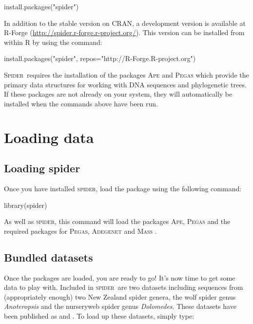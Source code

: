 \documentclass{article}
\newcommand{\spider}{\textsc{spider}} %
\newcommand{\Spider}{\textsc{Spider}} %
\newcommand{\scinm}{\emph}
\newcommand{\progname}[1]{\textsc{#1}}
\begin{document}
\begin{console}
install.packages("spider")
\end{console}

In addition to the stable version on CRAN, a development version is available at R-Forge (\href{http://spider.r-forge.r-project.org/}{http://spider.r-forge.r-project.org/}). This version can be installed from within \progname{R} by using the command:

\begin{console}
install.packages("spider", repos="http://R-Forge.R-project.org")
\end{console}

\Spider~requires the installation of the packages \progname{Ape} \citep{SW.Para.2004.ape} and \progname{Pegas} \citep{SW.Para.2010.pegas} which provide the primary data structures for working with DNA sequences and phylogenetic trees. If these packages are not already on your system, they will automatically be installed when the commands above have been run.



\section{Loading data}

\subsection{Loading spider}
Once you have installed \spider, load the package using the following command: 

\begin{console}
library(spider)
\end{console}

As well as \spider, this command will load the packages \progname{Ape}, \progname{Pegas} and the required packages for \progname{Pegas}, \progname{Adegenet} \citep{Jomb.2008} and \progname{Mass} \citep{Vena.Ripl.2002}.


\subsection{Bundled datasets}
Once the packages are loaded, you are ready to go! It's now time to get some data to play with. Included in \spider~are two datasets including sequences from (appropriately enough) two New Zealand spider genera, the wolf spider genus \scinm{Anoteropsis} and the nurseryweb spider genus \scinm{Dolomedes}. These datasets have been published as \citet{Vink.Pate.2003} and \citet{Vink.Dupe.2010}. To load up these datasets, simply type: 
\end{document}
